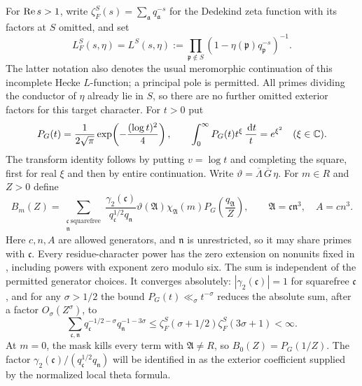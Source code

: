 For \(\operatorname{Re} s>1\), write
\(\zeta_F^S(s)=\sum_{\mathfrak a}q_{\mathfrak a}^{-s}\) for the Dedekind
zeta function with its factors at \(S\) omitted, and set
\[
 L_F^S(s,\eta)=L^S(s,\eta):=\prod_{\mathfrak p\notin S}
       (1-\eta(\mathfrak p)q_{\mathfrak p}^{-s})^{-1}.
\]
The latter notation also denotes the usual meromorphic continuation of
this incomplete Hecke \(L\)-function; a principal pole is permitted.  All
primes dividing the conductor of \(\eta\) already lie in \(S\), so there
are no further omitted exterior factors for this target character.
For \(t>0\) put
\begin{equation}\label{eq:reflection-gaussian}
 P_G(t)=\frac{1}{2\sqrt\pi}\exp\!\left(-\frac{(\log t)^2}{4}\right),
 \qquad
 \int_0^\infty P_G(t)t^\xi\,\frac{\,\mathrm{d} t}{t}=e^{\xi^2}
 \quad(\xi\in\mathbb{C}).
\end{equation}
The transform identity follows by putting \(v=\log t\) and completing the
square, first for real \(\xi\) and then by entire continuation.  Write
\(\vartheta=\overline\Lambda\,\overline G\,\eta\).  For \(m\in R\)
and \(Z>0\) define
\begin{equation}\label{eq:reflection-B-definition}
 B_m(Z)=
 \sum_{\substack{\mathfrak c\ \mathrm{squarefree}\\ \mathfrak n}}
 \frac{\gamma_2(\mathfrak c)}{q_{\mathfrak c}^{1/2}q_{\mathfrak n}}
 \vartheta(\mathfrak A)\chi_{\mathfrak A}(m)
 P_G\!\left(\frac{q_{\mathfrak A}}{Z}\right),
 \qquad
 \mathfrak A=\mathfrak c\mathfrak n^3,\quad A=c n^3.
\end{equation}
Here \(c,n,A\) are allowed generators, and \(\mathfrak n\) is unrestricted,
so it may share primes with \(\mathfrak c\).
Every residue-character power has the zero extension on nonunits fixed in
, including powers with exponent zero modulo six.
The sum is independent of the permitted generator choices.  It converges
absolutely: \(|\gamma_2(\mathfrak c)|=1\) for squarefree \(\mathfrak c\),
and for any \(\sigma>1/2\) the bound \(P_G(t)\ll_\sigma t^{-\sigma}\)
reduces the absolute sum, after a factor \(O_\sigma(Z^\sigma)\), to
\begin{equation}\label{eq:reflection-original-dirichlet-majorant}
 \sum_{\mathfrak c,\mathfrak n}
 q_{\mathfrak c}^{-1/2-\sigma}q_{\mathfrak n}^{-1-3\sigma}
 \leq \zeta_F^S(\sigma+1/2)\zeta_F^S(3\sigma+1)<\infty.
\end{equation}
At \(m=0\), the mask kills every term with \(\mathfrak A\ne R\), so
\(B_0(Z)=P_G(1/Z)\).  The factor
\(\gamma_2(\mathfrak c)/(q_{\mathfrak c}^{1/2}q_{\mathfrak n})\) will be
identified in  as the exterior coefficient supplied by the
normalized local theta formula.

